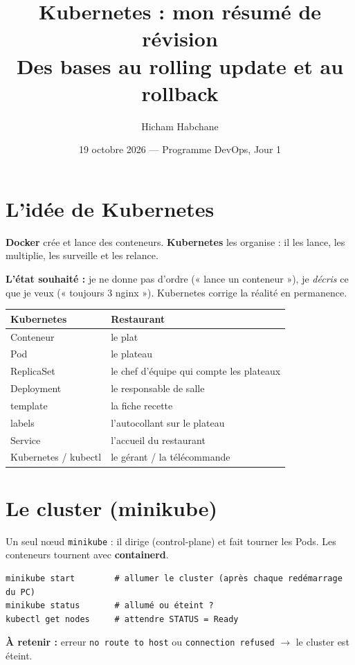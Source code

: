 \documentclass[11pt,a4paper]{article}
\title{\textbf{\textcolor{bleu}{Kubernetes : mon résumé de révision}}\\[4pt]
\large Des bases au rolling update et au rollback}
\author{Hicham Habchane}
\date{19 octobre 2026 --- Programme DevOps, Jour 1}
\newcommand{\retenir}[1]{\par\smallskip\noindent\colorbox{fond}{\parbox{\dimexpr\linewidth-2\fboxsep}{\textbf{\textcolor{bleu}{À retenir :}} #1}}\par\smallskip}
\begin{document}
\maketitle

\section{L'idée de Kubernetes}

\textbf{Docker} crée et lance des conteneurs. \textbf{Kubernetes} les organise : il les lance, les multiplie, les surveille et les relance.

\textbf{L'état souhaité :} je ne donne pas d'ordre (« lance un conteneur »), je \emph{décris} ce que je veux (« toujours 3 nginx »). Kubernetes corrige la réalité en permanence.

\begin{center}
\begin{tabular}{@{}ll@{}}
\toprule
\textbf{Kubernetes} & \textbf{Restaurant} \\
\midrule
Conteneur & le plat \\
Pod & le plateau \\
ReplicaSet & le chef d'équipe qui compte les plateaux \\
Deployment & le responsable de salle \\
template & la fiche recette \\
labels & l'autocollant sur le plateau \\
Service & l'accueil du restaurant \\
Kubernetes / kubectl & le gérant / la télécommande \\
\bottomrule
\end{tabular}
\end{center}

\section{Le cluster (minikube)}

Un seul nœud \texttt{minikube} : il dirige (control-plane) et fait tourner les Pods. Les conteneurs tournent avec \textbf{containerd}.

\begin{lstlisting}
minikube start        # allumer le cluster (après chaque redémarrage du PC)
minikube status       # allumé ou éteint ?
kubectl get nodes     # attendre STATUS = Ready
\end{lstlisting}
\retenir{erreur \texttt{no route to host} ou \texttt{connection refused} $\rightarrow$ le cluster est éteint.}
\end{document}

